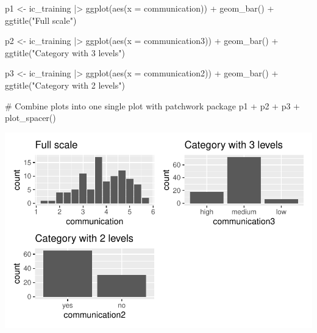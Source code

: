 \documentclass[
  letterpaper,
  DIV=11,
  numbers=noendperiod]{scrreprt}
\newenvironment{Shaded}{\begin{snugshade}}{\end{snugshade}}
\newcommand{\AttributeTok}[1]{\textcolor[rgb]{0.40,0.45,0.13}{#1}}
\newcommand{\CommentTok}[1]{\textcolor[rgb]{0.37,0.37,0.37}{#1}}
\newcommand{\FunctionTok}[1]{\textcolor[rgb]{0.28,0.35,0.67}{#1}}
\newcommand{\NormalTok}[1]{\textcolor[rgb]{0.00,0.23,0.31}{#1}}
\newcommand{\OtherTok}[1]{\textcolor[rgb]{0.00,0.23,0.31}{#1}}
\newcommand{\SpecialCharTok}[1]{\textcolor[rgb]{0.37,0.37,0.37}{#1}}
\newcommand{\StringTok}[1]{\textcolor[rgb]{0.13,0.47,0.30}{#1}}
\begin{document}
\begin{Shaded}
\begin{Highlighting}[]
\NormalTok{p1 }\OtherTok{\textless{}{-}}
\NormalTok{  ic\_training }\SpecialCharTok{|\textgreater{}}
  \FunctionTok{ggplot}\NormalTok{(}\FunctionTok{aes}\NormalTok{(}\AttributeTok{x =}\NormalTok{ communication)) }\SpecialCharTok{+}
  \FunctionTok{geom\_bar}\NormalTok{() }\SpecialCharTok{+}
  \FunctionTok{ggtitle}\NormalTok{(}\StringTok{"Full scale"}\NormalTok{)}

\NormalTok{p2 }\OtherTok{\textless{}{-}}
\NormalTok{  ic\_training }\SpecialCharTok{|\textgreater{}}
  \FunctionTok{ggplot}\NormalTok{(}\FunctionTok{aes}\NormalTok{(}\AttributeTok{x =}\NormalTok{ communication3)) }\SpecialCharTok{+}
  \FunctionTok{geom\_bar}\NormalTok{() }\SpecialCharTok{+}
  \FunctionTok{ggtitle}\NormalTok{(}\StringTok{"Category with 3 levels"}\NormalTok{)}

\NormalTok{p3 }\OtherTok{\textless{}{-}}
\NormalTok{  ic\_training }\SpecialCharTok{|\textgreater{}}
  \FunctionTok{ggplot}\NormalTok{(}\FunctionTok{aes}\NormalTok{(}\AttributeTok{x =}\NormalTok{ communication2)) }\SpecialCharTok{+}
  \FunctionTok{geom\_bar}\NormalTok{() }\SpecialCharTok{+}
  \FunctionTok{ggtitle}\NormalTok{(}\StringTok{"Category with 2 levels"}\NormalTok{)}

\CommentTok{\# Combine plots into one single plot with \textquotesingle{}patchwork\textquotesingle{} package}
\NormalTok{p1 }\SpecialCharTok{+}\NormalTok{ p2 }\SpecialCharTok{+}\NormalTok{ p3 }\SpecialCharTok{+} \FunctionTok{plot\_spacer}\NormalTok{()}
\end{Highlighting}
\end{Shaded}

\includegraphics{11_group_comparison_files/figure-pdf/comparing-categorical-vs-numerical-1.pdf}
\end{document}
